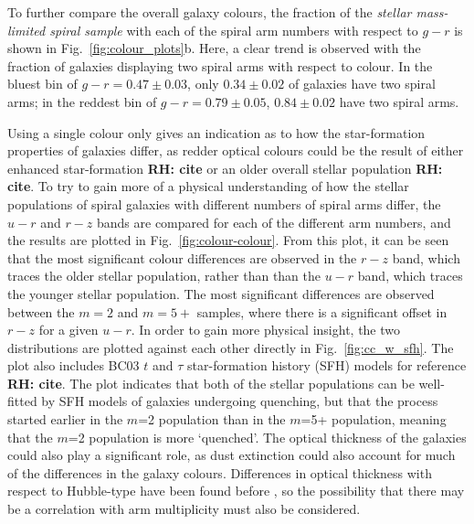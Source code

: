 \documentclass[useAMS,usenatbib]{mn2e}
\newcommand{\rh}[1]{{\bf \textcolor{RoyalPurple}{RH: #1}}}
\begin{document}
To further compare the overall galaxy colours, the fraction of the \textit{stellar mass-limited spiral sample} with each of the spiral arm numbers with respect to $g-r$ is shown in Fig.~\ref{fig:colour_plots}b. Here, a clear trend is observed with the fraction of galaxies displaying two spiral arms with respect to colour. In the bluest bin of $g-r=0.47 \pm 0.03$, only $0.34 \pm 0.02$ of galaxies have two spiral arms; in the reddest bin of $g-r=0.79 \pm 0.05$, $0.84 \pm 0.02$ have two spiral arms.

Using a single colour only gives an indication as to how the star-formation properties of galaxies differ, as redder optical colours could be the result of either enhanced star-formation \rh{cite} or an older overall stellar population \rh{cite}. To try to gain more of a physical understanding of how the stellar populations of spiral galaxies with different numbers of spiral arms differ, the $u-r$ and $r-z$ bands are compared for each of the different arm numbers, and the results are plotted in Fig.~\ref{fig:colour-colour}. From this plot, it can be seen that the most significant colour differences are observed in the $r-z$ band, which traces the older stellar population, rather than than the $u-r$ band, which traces the younger stellar population. The most significant differences are observed between the $m=2$ and $m=5+$ samples, where there is a significant offset in $r-z$ for a given $u-r$. In order to gain more physical insight, the two distributions are plotted against each other directly in Fig.~\ref{fig:cc_w_sfh}. The plot also includes BC03 $t$ and $\tau$ star-formation history (SFH) models for reference \rh{cite}. The plot indicates that both of the stellar populations can be well-fitted by SFH models of galaxies undergoing quenching, but that the process started earlier in the $m$=2 population than in the $m$=5+ population, meaning that the $m$=2 population is more `quenched'. The optical thickness of the galaxies could also play a significant role, as dust extinction could also account for much of the differences in the galaxy colours. Differences in optical thickness with respect to Hubble-type have been found before \citep{Ma_02}, so the possibility that there may be a correlation with arm multiplicity must also be considered.
\end{document}
